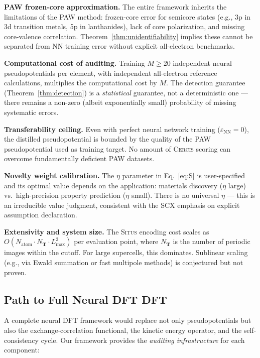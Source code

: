 \documentclass[11pt,a4paper]{article}
\theoremstyle{definition}
\newcommand{\Situs}{\textsc{Situs}}
\newcommand{\Cercis}{\textsc{Cercis}}
\newcommand{\SCX}{\textsc{SCX}}
\begin{document}
\textbf{PAW frozen-core approximation.} The entire framework inherits the limitations of the PAW method: frozen-core error for semicore states (e.g., 3p in 3d transition metals, 5p in lanthanides), lack of core polarization, and missing core-valence correlation. Theorem~\ref{thm:unidentifiability} implies these cannot be separated from NN training error without explicit all-electron benchmarks.

\textbf{Computational cost of auditing.} Training $M \geq 20$ independent neural pseudopotentials per element, with independent all-electron reference calculations, multiplies the computational cost by $M$. The detection guarantee (Theorem~\ref{thm:detection}) is a \textit{statistical} guarantee, not a deterministic one — there remains a non-zero (albeit exponentially small) probability of missing systematic errors.

\textbf{Transferability ceiling.} Even with perfect neural network training ($\varepsilon_{\mathrm{NN}} = 0$), the distilled pseudopotential is bounded by the quality of the PAW pseudopotential used as training target. No amount of \Cercis{} scoring can overcome fundamentally deficient PAW datasets.

\textbf{Novelty weight calibration.} The $\eta$ parameter in Eq.~\eqref{eq:S} is user-specified and its optimal value depends on the application: materials discovery ($\eta$ large) vs.\ high-precision property prediction ($\eta$ small). There is no universal $\eta$ — this is an irreducible value judgment, consistent with the \SCX{} emphasis on explicit assumption declaration.

\textbf{Extensivity and system size.} The \Situs{} encoding cost scales as $O(N_{\mathrm{atom}} \cdot N_{\mathbf{T}} \cdot L_{\max}^2)$ per evaluation point, where $N_{\mathbf{T}}$ is the number of periodic images within the cutoff. For large supercells, this dominates. Sublinear scaling (e.g., via Ewald summation or fast multipole methods) is conjectured but not proven.

\subsection{Path to Full Neural DFT DFT}

A complete neural DFT framework would replace not only pseudopotentials but also the exchange-correlation functional, the kinetic energy operator, and the self-consistency cycle. Our framework provides the \textit{auditing infrastructure} for each component:
\end{document}
